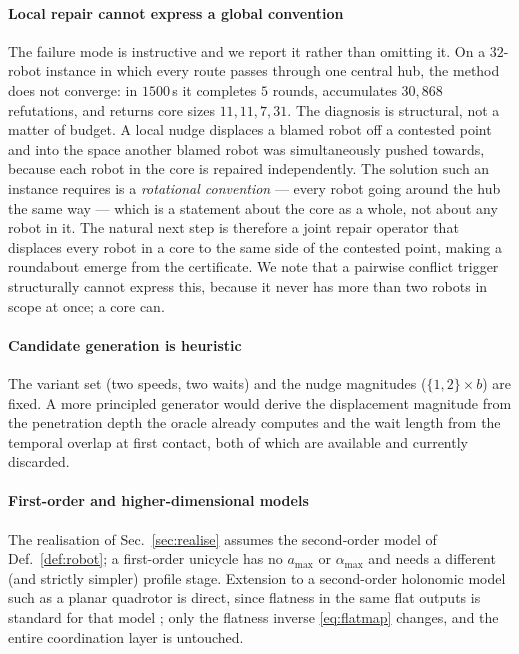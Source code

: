 \documentclass[conference]{IEEEtran}
\begin{document}
\paragraph*{Local repair cannot express a global convention}
The failure mode is instructive and we report it rather than omitting it. On a $32$-robot
instance in which every route passes through one central hub, the method does not converge:
in $1500$\,s it completes $5$ rounds, accumulates $30{,}868$ refutations, and returns core
sizes $11, 11, 7, 31$. The diagnosis is structural, not a matter of budget. A local nudge
displaces a blamed robot off a contested point and into the space another blamed robot was
simultaneously pushed towards, because each robot in the core is repaired independently. The
solution such an instance requires is a \emph{rotational convention} --- every robot going
around the hub the same way --- which is a statement about the core as a whole, not about
any robot in it. The natural next step is therefore a joint repair operator that displaces
every robot in a core to the same side of the contested point, making a roundabout emerge
from the certificate. We note that a pairwise conflict trigger structurally cannot express
this, because it never has more than two robots in scope at once; a core can.

\paragraph*{Candidate generation is heuristic}
The variant set (two speeds, two waits) and the nudge magnitudes ($\{1,2\}\times b$) are
fixed. A more principled generator would derive the displacement magnitude from the
penetration depth the oracle already computes and the wait length from the temporal overlap
at first contact, both of which are available and currently discarded.

\paragraph*{First-order and higher-dimensional models}
The realisation of Sec.~\ref{sec:realise} assumes the second-order model of
Def.~\ref{def:robot}; a first-order unicycle has no $a_{\max}$ or $\alpha_{\max}$ and needs
a different (and strictly simpler) profile stage. Extension to a second-order holonomic
model such as a planar quadrotor is direct, since flatness in the same flat outputs is
standard for that model \cite{mellinger2011}; only the flatness inverse
\eqref{eq:flatmap} changes, and the entire coordination layer is untouched.
\end{document}
